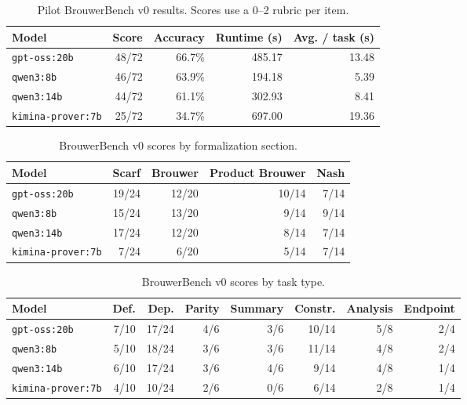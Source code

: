 \begin{table}[t]
\centering
\caption{Pilot BrouwerBench v0 results. Scores use a 0--2 rubric per item.}
\label{tab:brouwerbench-v0-models}
\begin{tabular}{lrrrr}
\toprule
Model & Score & Accuracy & Runtime (s) & Avg. / task (s) \\
\midrule
\texttt{gpt-oss:20b} & 48/72 & 66.7\% & 485.17 & 13.48 \\
\texttt{qwen3:8b} & 46/72 & 63.9\% & 194.18 & 5.39 \\
\texttt{qwen3:14b} & 44/72 & 61.1\% & 302.93 & 8.41 \\
\texttt{kimina-prover:7b} & 25/72 & 34.7\% & 697.00 & 19.36 \\
\bottomrule
\end{tabular}
\end{table}

\begin{table}[t]
\centering
\caption{BrouwerBench v0 scores by formalization section.}
\label{tab:brouwerbench-v0-sections}
\begin{tabular}{lrrrr}
\toprule
Model & Scarf & Brouwer & Product Brouwer & Nash \\
\midrule
\texttt{gpt-oss:20b} & 19/24 & 12/20 & 10/14 & 7/14 \\
\texttt{qwen3:8b} & 15/24 & 13/20 & 9/14 & 9/14 \\
\texttt{qwen3:14b} & 17/24 & 12/20 & 8/14 & 7/14 \\
\texttt{kimina-prover:7b} & 7/24 & 6/20 & 5/14 & 7/14 \\
\bottomrule
\end{tabular}
\end{table}

\begin{table}[t]
\centering
\caption{BrouwerBench v0 scores by task type.}
\label{tab:brouwerbench-v0-task-types}
\begin{tabular}{lrrrrrrr}
\toprule
Model & Def. & Dep. & Parity & Summary & Constr. & Analysis & Endpoint \\
\midrule
\texttt{gpt-oss:20b} & 7/10 & 17/24 & 4/6 & 3/6 & 10/14 & 5/8 & 2/4 \\
\texttt{qwen3:8b} & 5/10 & 18/24 & 3/6 & 3/6 & 11/14 & 4/8 & 2/4 \\
\texttt{qwen3:14b} & 6/10 & 17/24 & 3/6 & 4/6 & 9/14 & 4/8 & 1/4 \\
\texttt{kimina-prover:7b} & 4/10 & 10/24 & 2/6 & 0/6 & 6/14 & 2/8 & 1/4 \\
\bottomrule
\end{tabular}
\end{table}
